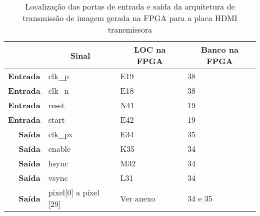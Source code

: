 \begin{table}[h!]
	\centering
		\begin{tabular}{rlll}
			\hline
			\multicolumn{1}{c}{\textbf{}}         & \multicolumn{1}{c}{\textbf{Sinal}} & \multicolumn{1}{c}{\textbf{LOC na FPGA}} & \multicolumn{1}{c}{\textbf{Banco na FPGA}} \\ \hline
			\multicolumn{1}{r|}{\textbf{Entrada}} & clk\_p                             & E19                                      & 38                                         \\
			\multicolumn{1}{r|}{\textbf{Entrada}} & clk\_n                             & E18                                      & 38                                         \\
			\multicolumn{1}{r|}{\textbf{Entrada}} & reset                              & N41                                      & 19                                         \\
			\multicolumn{1}{r|}{\textbf{Entrada}} & start                              & E42                                      & 19                                         \\
			\multicolumn{1}{r|}{\textbf{Saída}}   & clk\_px                            & E34                                      & 35                                         \\
			\multicolumn{1}{r|}{\textbf{Saída}}   & enable                             & K35                                      & 34                                         \\
			\multicolumn{1}{r|}{\textbf{Saída}}   & hsync                              & M32                                      & 34                                         \\
			\multicolumn{1}{r|}{\textbf{Saída}}   & vsync                              & L31                                      & 34                                         \\
			\multicolumn{1}{r|}{\textbf{Saída}}   & pixel[0] a pixel [29]                              & Ver anexo                                & 34 e 35                                    \\ \hline
		\end{tabular}
	\captionsetup{width=0.75\linewidth}
	\caption{Localização das portas de entrada e saída da arquitetura de transmissão de imagem gerada na FPGA para a placa HDMI transmissora}
	\label{table:LOCplanA_simples}
\end{table}

